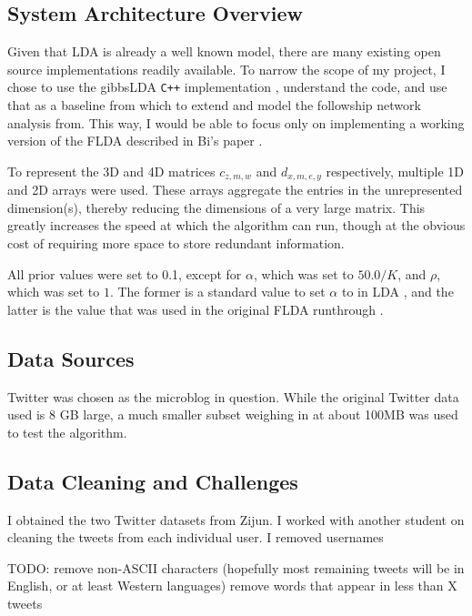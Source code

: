 \documentclass[a4paper]{article}
\begin{document}
\subsection{System Architecture Overview}
Given that LDA is already a well known model, there are many existing open source implementations readily available. To narrow the scope of my project, I chose to use the gibbsLDA \verb!C++! implementation \cite{gibbs_lda}, understand the code, and use that as a baseline from which to extend and model the followship network analysis from. This way, I would be able to focus only on implementing a working version of the FLDA described in Bi's paper \cite{flda}.

To represent the 3D and 4D matrices $c_{z, m, w}$ and $d_{x, m, e, y}$ respectively, multiple 1D and 2D arrays were used. These arrays aggregate the entries in the unrepresented dimension(s), thereby reducing the dimensions of a very large matrix. This greatly increases the speed at which the algorithm can run, though at the obvious cost of requiring more space to store redundant information.

All prior values were set to 0.1, except for $\alpha$, which was set to $50.0 / K$, and $\rho$, which was set to $1$. The former is a standard value to set $\alpha$ to in LDA \cite{lda}, and the latter is the value that was used in the original FLDA runthrough \cite{flda}.

\subsection{Data Sources}
Twitter was chosen as the microblog in question. While the original Twitter data used is 8 GB large, a much smaller subset weighing in at about 100MB was used to test the algorithm.

\subsection{Data Cleaning and Challenges}
I obtained the two Twitter datasets from Zijun. 
I worked with another student on cleaning the tweets from each individual user. I removed usernames 

TODO: remove non-ASCII characters (hopefully most remaining tweets will be in English, or at least Western languages)
remove words that appear in less than X tweets

\end{document}
